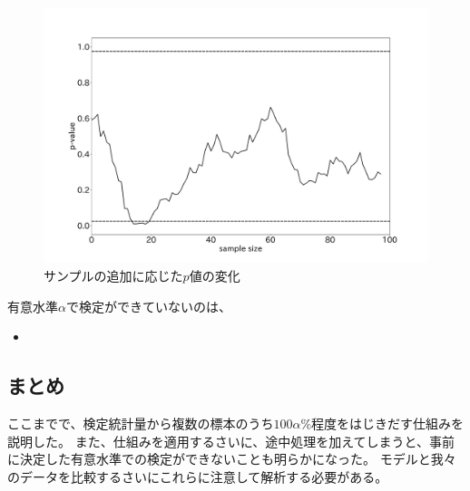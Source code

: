 \begin{figure}
  \begin{center}
    \includegraphics[width=15cm]{./image/04_/recurssive_test.pdf}
    \caption{サンプルの追加に応じた$p$値の変化}
        \label{fig:time_series_p_value}
    \end{center}
\end{figure}





有意水準$\alpha$で検定ができていないのは、
\begin{itemize}
  \item 
\end{itemize}
\fi

\subsection{まとめ}
ここまでで、検定統計量から複数の標本のうち$100\alpha\%$程度をはじきだす仕組みを説明した。
また、仕組みを適用するさいに、途中処理を加えてしまうと、事前に決定した有意水準での検定ができないことも明らかになった。
モデルと我々のデータを比較するさいにこれらに注意して解析する必要がある。

